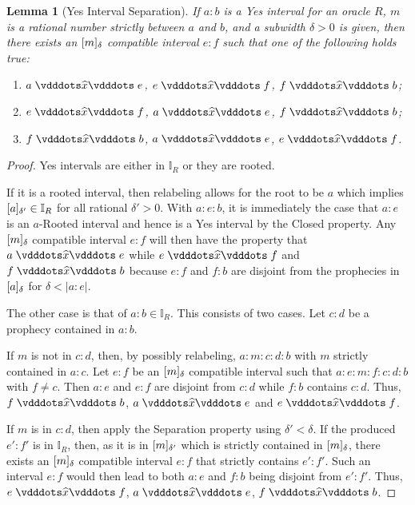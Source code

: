 \documentclass[12pt]{article}
\newtheorem{lemma}{Lemma}[section]
\begin{document}
\begin{lemma}[Yes Interval Separation]
    If $a: b$ is a Yes interval for an oracle $R$, $m$ is a rational number strictly between $a$ and $b$, and a subwidth $\delta > 0$ is given, then there exists an $\halo{m}$ compatible interval $e:f$ such that one of the following holds true:
    \begin{enumerate}
        \item $a \xora e$, \sout{$e\xora f$}, \sout{$f\xora b$};
        \item $e \xora f$, \sout{$a\xora e$}, \sout{$f\xora b$};
        \item $f \xora b$, \sout{$a\xora e$}, \sout{$e\xora f$}.
    \end{enumerate}
\end{lemma}

\begin{proof}
    Yes intervals are either in $\mathbb{I}_R$ or they are rooted. 
    
    If it is a rooted interval, then relabeling allows for the root to be $a$ which implies $\halo[\delta']{a} \in \mathbb{I}_R$ for all rational $\delta' >0$. With $a:e:b$, it is immediately the case that $a:e$ is an $a$-Rooted interval and hence is a Yes interval by the Closed property. Any $\halo{m}$ compatible interval $e:f$ will then have the property that $a \xora e$ while \sout{$e\xora f$} and \sout{$f\xora b$} because $e:f$ and $f:b$ are disjoint from the prophecies in $\halo{a}$ for $\delta < |a:e|$.
 
    The other case is that of $a:b \in \mathbb{I}_R$. This consists of two cases. Let $c:d$ be a prophecy contained in $a:b$. 
    
    If $m$ is not in $c:d$, then, by possibly relabeling, $a:m:c:d:b$ with $m$ strictly contained in $a:c$.  Let $e:f$ be an $\halo{m}$ compatible interval such that $a:e:m:f:c:d:b$ with $f \neq c$. Then $a:e$ and $e:f$ are disjoint from $c:d$ while $f:b$ contains $c:d$. Thus, $f \xora b$, \sout{$a\xora e$} and \sout{$e\xora f$}.

    If $m$ is in $c:d$, then apply the Separation property using  $\delta' < \delta$. If the produced $e':f'$ is in $\mathbb{I}_R$, then, as it is in $\halo[\delta']{m}$ which is strictly contained in $\halo{m}$, there exists an $\halo{m}$ compatible interval $e:f$ that strictly contains $e':f'$. Such an interval $e:f$ would then lead to both $a:e$ and $f:b$ being disjoint from $e':f'$. Thus, $e \xora f$, \sout{$a\xora e$}, \sout{$f\xora b$}.


\end{proof}
\end{document}
